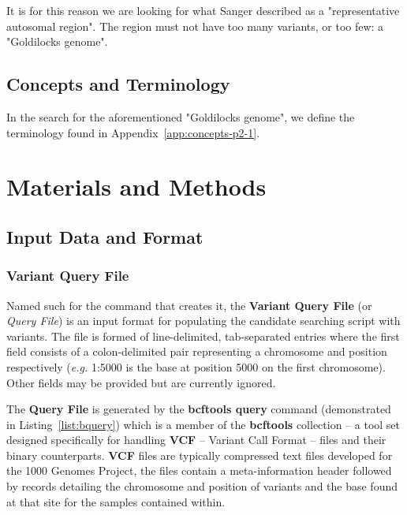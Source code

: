 It is for this reason we are looking for what Sanger described as a
"representative autosomal region". The region must not have too many
variants, or too few: a "Goldilocks genome".


\section{Concepts and Terminology}

In the search for the aforementioned "Goldilocks genome", we define the
terminology found in Appendix~\ref{app:concepts-p2-1}.



\chapter{Materials and Methods}
\section{Input Data and Format}
\label{chap:part2:input}

\subsection{Variant Query File}
\label{sec:vqf}

Named such for the command that creates it, the \textbf{Variant Query File} (or
\textit{Query File}) is an input format for populating the candidate searching
script with variants. The file is formed of line-delimited, tab-separated
entries where the first field consists of a colon-delimited pair representing a
chromosome and position respectively (\textit{e.g.} 1:5000 is the base at
position 5000 on the first chromosome). Other fields may be provided but are
currently ignored.

The \textbf{Query File} is generated by the
\textbf{bcftools query}\citep{man:bcftools-query} command
(demonstrated in Listing~\ref{list:bquery}) which is a member of the
\textbf{bcftools} collection -- a tool set designed specifically for
handling \textbf{VCF} -- Variant Call Format\citep{vcf}\citep{vcft} --
files and their binary counterparts. \textbf{VCF} files are typically compressed
text files developed for the 1000 Genomes Project, the files contain a
meta-information header followed by records detailing the chromosome and
position of variants and the base found at that site for the samples contained
within.

